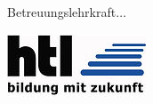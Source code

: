 \begin{titlepage}
\begin{center}
\end{center}

\vspace{1cm}
\noindent
\Large
Betreuungslehrkraft$\ldots$

\begin{center}
\vfill
\includegraphics[scale=0.15]{assets/htl-bildung-mit-zukunft-logo.jpg}
\end{center}


\end{titlepage}

\addtocounter{page}{1}